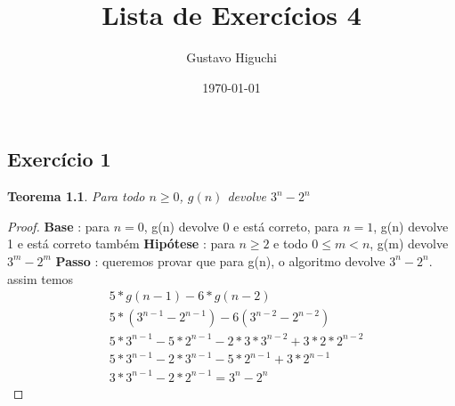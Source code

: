 \documentclass{article}
\title{Lista de Exercícios 4}
\author{Gustavo Higuchi}
\date{\today}
\begin{document}
\maketitle

\tableofcontents
\newpage


\chapter{}

\section{Exercício 1}
\newtheorem{teo1}{Teorema}
\begin{teo1}
	Para todo $n \geq 0$, $g(n)$ devolve $3^n-2^n$
\end{teo1}
\begin{proof}
	\hfill \break
	\textbf{Base} : para $n = 0$, g(n) devolve 0 e está correto,\newline
	\hspace*{30pt} para $n = 1$, g(n) devolve 1 e está correto também\newline
	\newline
	\textbf{Hipótese} : para $n \geq 2$ e todo $0\leq m < n$, g(m) devolve $3^m-2^m$\newline
	\textbf{Passo} : queremos provar que para g(n), o algoritmo devolve $3^n-2^n$.\newline
	\hspace*{30pt} assim temos \newline
	\begin{equation}
		\begin{split}
		& 5*g(n-1) - 6*g(n-2) \\
		&5*(3^{n-1} - 2^{n-1}) - 6(3^{n-2}-2^{n-2})\\
		&5*3^{n-1} - 5*2^{n-1} - 2*3*3^{n-2} + 3*2*2^{n-2}\\
		&5*3^{n-1} - 2*3^{n-1} - 5*2^{n-1} + 3*2^{n-1}\\
		&3*3^{n-1} - 2*2^{n-1} = 3^n - 2^n
		\end{split}	
	\end{equation}	

\end{proof}
\end{document}
